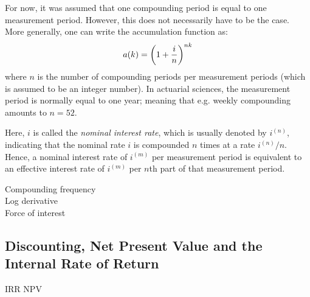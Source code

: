For now, it was assumed that one compounding period is equal to one measurement period. However, this does not necessarily have to be the case. More generally, one can write the accumulation function as:
$$a(k) = \qty(1 + \frac{i}{n})^{nk}$$
where $n$ is the number of compounding periods per measurement periods (which is assumed to be an integer number). In actuarial sciences, the measurement period is normally equal to one year; meaning that e.g. weekly compounding amounts to $n = 52$.

Here, $i$ is called the \emph{nominal interest rate}, which is usually denoted by $i^{(n)}$, indicating that the nominal rate $i$ is compounded $n$ times at a rate $i^{(n)}/n$. Hence, a nominal interest rate of $i^{(m)}$ per measurement period is equivalent to an effective interest rate of $ i^{(m)}$ per $n$th part of that measurement period. 


Compounding frequency\\
Log derivative\\
Force of interest\\

\subsection{Discounting, Net Present Value and the Internal Rate of Return}
\ac{IRR}
\ac{NPV}



